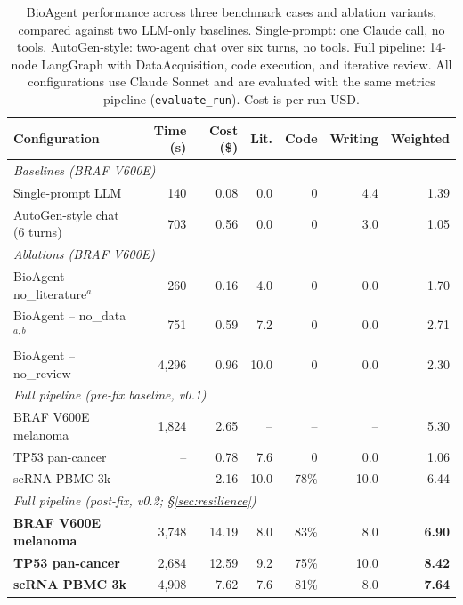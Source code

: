 \documentclass[11pt]{article}
\begin{document}
\begin{table}[htbp]
\caption{BioAgent performance across three benchmark cases and ablation
  variants, compared against two LLM-only baselines.
  Single-prompt: one Claude call, no tools.
  AutoGen-style: two-agent chat over six turns, no tools.
  Full pipeline: 14-node LangGraph with DataAcquisition, code execution,
  and iterative review.
  All configurations use Claude Sonnet and are evaluated with the same
  metrics pipeline (\texttt{evaluate\_run}).
  Cost is per-run USD.}
\label{tab:braf_run}
\centering
\small
\begin{tabular}{lrrrrrr}
\toprule
\textbf{Configuration} &
  \textbf{Time (s)} &
  \textbf{Cost (\$)} &
  \textbf{Lit.} &
  \textbf{Code} &
  \textbf{Writing} &
  \textbf{Weighted} \\
\midrule
\multicolumn{7}{l}{\textit{Baselines (BRAF V600E)}} \\
Single-prompt LLM                  & 140     & 0.08 & 0.0  & 0  & 4.4  & 1.39 \\
AutoGen-style chat (6 turns)       & 703     & 0.56 & 0.0  & 0  & 3.0  & 1.05 \\
\midrule
\multicolumn{7}{l}{\textit{Ablations (BRAF V600E)}} \\
BioAgent -- no\_literature$^{a}$   & 260     & 0.16 & 4.0  & 0  & 0.0  & 1.70 \\
BioAgent -- no\_data$^{a,b}$       & 751     & 0.59 & 7.2  & 0  & 0.0  & 2.71 \\
BioAgent -- no\_review             & 4{,}296 & 0.96 & 10.0 & 0  & 0.0  & 2.30 \\
\midrule
\multicolumn{7}{l}{\textit{Full pipeline (pre-fix baseline, v0.1)}} \\
BRAF V600E melanoma                 & 1{,}824 & 2.65 & --   & -- & --   & 5.30 \\
TP53 pan-cancer                     & --      & 0.78 & 7.6  & 0  & 0.0  & 1.06 \\
scRNA PBMC 3k                       & --      & 2.16 & 10.0 & 78\% & 10.0 & 6.44 \\
\midrule
\multicolumn{7}{l}{\textit{Full pipeline (post-fix, v0.2; \S\ref{sec:resilience})}} \\
\textbf{BRAF V600E melanoma}        & 3{,}748 & 14.19 & 8.0  & 83\% & 8.0  & \textbf{6.90} \\
\textbf{TP53 pan-cancer}            & 2{,}684 & 12.59 & 9.2  & 75\% & 10.0 & \textbf{8.42} \\
\textbf{scRNA PBMC 3k}              & 4{,}908 & 7.62 & 7.6  & 81\% & 8.0  & \textbf{7.64} \\

\end{tabular}
\end{table}
\end{document}
